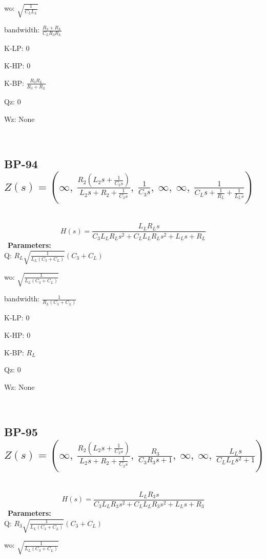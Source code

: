\documentclass{article}
\begin{document}
wo: $\sqrt{\frac{1}{C_{L} L_{L}}}$\ 

bandwidth: $\frac{R_{3} + R_{L}}{C_{L} R_{3} R_{L}}$\ 

K-LP: $0$\ 

K-HP: $0$\ 

K-BP: $\frac{R_{3} R_{L}}{R_{3} + R_{L}}$\ 

Qz: $0$\ 

Wz: $\text{None}$\ 

\ 

\subsection{BP-94 $Z(s) = \left( \infty, \  \frac{R_{2} \left(L_{2} s + \frac{1}{C_{2} s}\right)}{L_{2} s + R_{2} + \frac{1}{C_{2} s}}, \  \frac{1}{C_{3} s}, \  \infty, \  \infty, \  \frac{1}{C_{L} s + \frac{1}{R_{L}} + \frac{1}{L_{L} s}}\right)$ } \ 
\textbf{\[H(s) = \frac{L_{L} R_{L} s}{C_{3} L_{L} R_{L} s^{2} + C_{L} L_{L} R_{L} s^{2} + L_{L} s + R_{L}}\] } \ 
\textbf{Parameters:}\\ 

Q: $R_{L} \sqrt{\frac{1}{L_{L} \left(C_{3} + C_{L}\right)}} \left(C_{3} + C_{L}\right)$\ 

wo: $\sqrt{\frac{1}{L_{L} \left(C_{3} + C_{L}\right)}}$\ 

bandwidth: $\frac{1}{R_{L} \left(C_{3} + C_{L}\right)}$\ 

K-LP: $0$\ 

K-HP: $0$\ 

K-BP: $R_{L}$\ 

Qz: $0$\ 

Wz: $\text{None}$\ 

\ 

\subsection{BP-95 $Z(s) = \left( \infty, \  \frac{R_{2} \left(L_{2} s + \frac{1}{C_{2} s}\right)}{L_{2} s + R_{2} + \frac{1}{C_{2} s}}, \  \frac{R_{3}}{C_{3} R_{3} s + 1}, \  \infty, \  \infty, \  \frac{L_{L} s}{C_{L} L_{L} s^{2} + 1}\right)$ } \ 
\textbf{\[H(s) = \frac{L_{L} R_{3} s}{C_{3} L_{L} R_{3} s^{2} + C_{L} L_{L} R_{3} s^{2} + L_{L} s + R_{3}}\] } \ 
\textbf{Parameters:}\\ 

Q: $R_{3} \sqrt{\frac{1}{L_{L} \left(C_{3} + C_{L}\right)}} \left(C_{3} + C_{L}\right)$\ 

wo: $\sqrt{\frac{1}{L_{L} \left(C_{3} + C_{L}\right)}}$\ 
\end{document}
